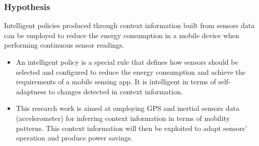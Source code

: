 \documentclass[compress,9pt,xcolor={dvipsnames,table}]{beamer}
\begin{document}
\begin{frame}\frametitle{Hypothesis}
\begin{tcolorbox}[title=Hypothesis,colframe=PineGreen]
Intelligent policies produced through context information built from sensors data can be employed to reduce the energy consumption in a mobile device when performing continuous sensor readings.
\end{tcolorbox}

{
\small
\begin{itemize}
  \item An intelligent policy is a special rule that defines how sensors should be selected and configured to reduce the energy consumption and achieve the requirements of a mobile sensing app.
  It is intelligent in terms of self-adaptness to changes detected in context information.
  \item This research work is aimed at employing GPS and inertial sensors data (accelerometer) for inferring context information in terms of mobility patterns.
  This context information will then be exploited to adapt sensors' operation and produce power savings.
\end{itemize}
}
\end{frame}
\end{document}

